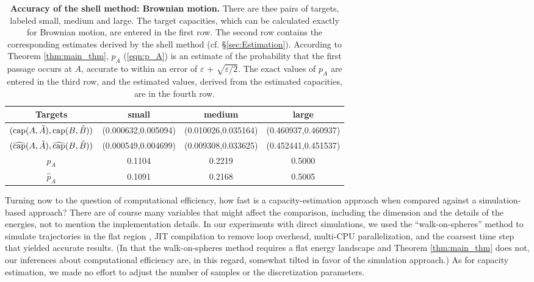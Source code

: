\documentclass[12pt, nofootinbib,english, amsmath, amssymb, aps, priprint, graphicx,floatfix]{revtex4-1}
\theoremstyle{plain}
\theoremstyle{definition}
\theoremstyle{plain}
\newcommand{\capac}[2]{\ensuremath{\operatorname{cap}}(#1,#2)}
\newcommand{\hatcapac}[2]{\ensuremath{\operatorname{\widehat{cap}}}(#1,#2)}
\begin{document}
{\begin{table}[!ht]
\begin{tabular}{ c| c c c}
      Targets & small & medium & large  \\
  \hline
  $\large(\capac{A}{\tilde A},\capac{B}{\tilde B}\large)$ 
  & (0.000632,0.005094) 
  & (0.010026,0.035164)
  & (0.460937,0.460937)
   \\
$\large(\hatcapac{A}{\tilde A},\hatcapac{B}{\tilde B}\large)$
  &(0.000549,0.004699)
  &(0.009308,0.033625)
  &(0.452441,0.451537)
  \\
  $p_A$ & 0.1104 & 0.2219 & 0.5000\\
  $\hat{p}_A$  & 0.1091 &0.2168 & 0.5005 \\
  \end{tabular}
  \caption{{\bf Accuracy of the shell method: Brownian motion.} 
  There are thee pairs of targets, labeled small, medium and large.
 The target capacities, which can be calculated exactly for Brownian motion, are entered in the first row. The second row contains the corresponding estimates derived by the shell method
(cf. \S\ref{sec:Estimation}). According to Theorem \ref{thm:main_thm}, $p_A$ (\ref{eqn:p_A}) is an estimate of the probability that the first passage occurs at $A$, accurate to within an error of $\varepsilon$ + $\sqrt{\varepsilon/2}$. The exact values
 of $p_A$ are entered in the third row, and the estimated values, derived from the estimated capacities, are in the fourth row.}
\label{table:brownian_capacities}
\end{table}

Turning now to the question of computational efficiency, 
how fast is a capacity-estimation approach when compared against a simulation-based approach?  There are of course many
variables that might affect the comparison, including the dimension and the details of the energies, not to mention the implementation details. In our experiments with direct simulations, we used the ``walk-on-spheres'' method to simulate trajectories in the flat region \cite{bingham1972random}, JIT compilation to remove loop overhead, multi-CPU parallelization, and the coarsest time step that yielded accurate results. (In that the walk-on-spheres method requires a flat energy landscape and Theorem \ref{thm:main_thm} does not, 
our inferences about computational efficiency are, in this regard, somewhat tilted in favor of the simulation approach.)
As for capacity estimation, we made no effort to adjust the number of samples or the discretization parameters. 

}
\end{document}
